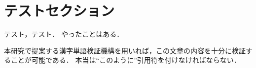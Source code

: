 \section{テストセクション}

テスト，テスト．
やったことはある．

本研究で提案する漢字単語検証機構を用いれば，この文章の内容を十分に検証することが可能である．
本当は``このように''引用符を付けなければならない．
